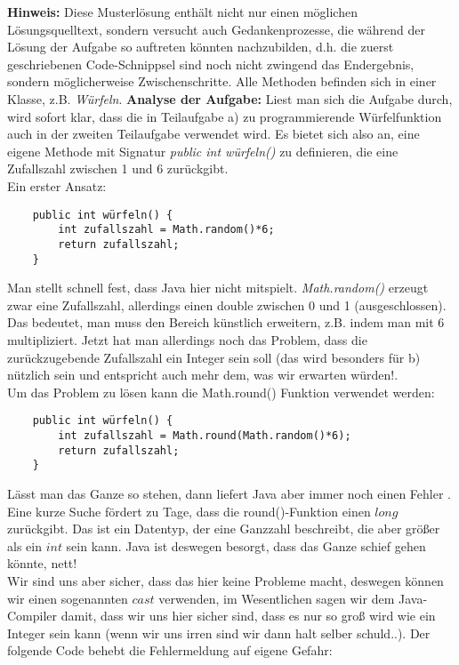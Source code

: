 \documentclass{article}
\begin{document}
\thispagestyle{firstpage}
\setlength{\headsep}{12pt}
\textbf{Hinweis:} Diese Musterlösung enthält nicht nur einen möglichen Lösungsquelltext, sondern versucht auch Gedankenprozesse, die während der Lösung der Aufgabe so auftreten könnten nachzubilden, d.h. die zuerst geschriebenen Code-Schnippsel sind noch nicht zwingend das Endergebnis, sondern möglicherweise Zwischenschritte. Alle Methoden befinden sich in einer Klasse, z.B. \textit{Würfeln}.
\vspace{0.5cm}
\textbf{Analyse der Aufgabe:} Liest man sich die Aufgabe durch, wird sofort klar, dass die in Teilaufgabe a) zu programmierende Würfelfunktion auch in der zweiten Teilaufgabe verwendet wird. Es bietet sich also an, eine eigene Methode mit Signatur \textit{public int würfeln()} zu definieren, die eine Zufallszahl zwischen 1 und 6 zurückgibt. \\
Ein erster Ansatz:
\begin{verbatim}
    public int würfeln() {
        int zufallszahl = Math.random()*6;
        return zufallszahl;
    }
\end{verbatim}
Man stellt schnell fest, dass Java hier nicht mitspielt. \textit{Math.random()} erzeugt zwar eine Zufallszahl, allerdings einen double zwischen 0 und 1 (ausgeschlossen). Das bedeutet, man muss den Bereich künstlich erweitern, z.B. indem man mit 6 multipliziert. Jetzt hat man allerdings noch das Problem, dass die zurückzugebende Zufallszahl ein Integer sein soll (das wird besonders für b) nützlich sein und entspricht auch mehr dem, was wir erwarten würden!. \\
Um das Problem zu lösen kann die Math.round() Funktion verwendet werden:
\begin{verbatim}
    public int würfeln() {
        int zufallszahl = Math.round(Math.random()*6);
        return zufallszahl;
    }
\end{verbatim}
Lässt man das Ganze so stehen, dann liefert Java aber immer noch einen Fehler . \\
Eine kurze Suche fördert zu Tage, dass die round()-Funktion einen $long$ zurückgibt. Das ist ein Datentyp, der eine Ganzzahl beschreibt, die aber größer als ein $int$ sein kann. Java ist deswegen besorgt, dass das Ganze schief gehen könnte, nett! \\
Wir sind uns aber sicher, dass das hier keine Probleme macht, deswegen können wir einen sogenannten $cast$ verwenden, im Wesentlichen sagen wir dem Java-Compiler damit, dass wir uns hier sicher sind, dass es nur so groß wird wie ein Integer sein kann (wenn wir uns irren sind wir dann halt selber schuld..). Der folgende Code behebt die Fehlermeldung auf eigene Gefahr:
\end{document}
